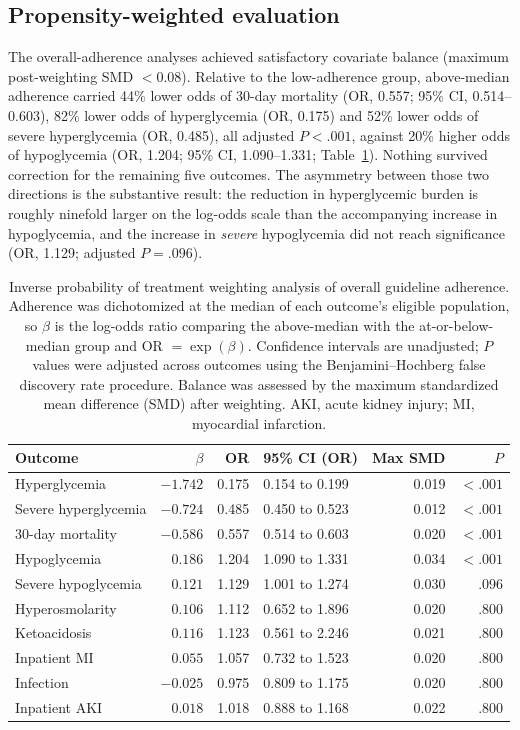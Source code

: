 \subsection{Propensity-weighted evaluation}

The overall-adherence analyses achieved satisfactory covariate balance (maximum
post-weighting SMD $<$0.08). Relative to the low-adherence group, above-median
adherence carried 44\% lower odds of 30-day mortality (OR, 0.557; 95\% CI,
0.514--0.603), 82\% lower odds of hyperglycemia (OR, 0.175) and 52\% lower odds
of severe hyperglycemia (OR, 0.485), all adjusted $P<.001$, against 20\% higher
odds of hypoglycemia (OR, 1.204; 95\% CI, 1.090--1.331;
Table~\ref{tab:iptw-overall}). Nothing survived correction for the remaining
five outcomes. The asymmetry between those two directions is the substantive
result: the reduction in hyperglycemic burden is roughly ninefold larger on the
log-odds scale than the accompanying increase in hypoglycemia, and the increase
in \emph{severe} hypoglycemia did not reach significance (OR, 1.129; adjusted
$P=.096$).

\begin{table}[t]
\centering
\caption{Inverse probability of treatment weighting analysis of overall
guideline adherence. Adherence was dichotomized at the median of each
outcome's eligible population, so $\beta$ is the log-odds ratio comparing the
above-median with the at-or-below-median group and OR $=\exp(\beta)$.
Confidence intervals are unadjusted; $P$ values were adjusted across outcomes
using the Benjamini--Hochberg false discovery rate procedure. Balance was
assessed by the maximum standardized mean difference (SMD) after weighting.
AKI, acute kidney injury; MI, myocardial infarction.}
\label{tab:iptw-overall}
\small
\setlength{\tabcolsep}{4pt}
\begin{tabular}{lrrlrr}
\toprule
Outcome & $\beta$ & OR & 95\% CI (OR) & Max SMD & $P$ \\
\midrule
Hyperglycemia        & $-1.742$ & 0.175 & 0.154 to 0.199 & 0.019 & $<.001$ \\
Severe hyperglycemia & $-0.724$ & 0.485 & 0.450 to 0.523 & 0.012 & $<.001$ \\
30-day mortality     & $-0.586$ & 0.557 & 0.514 to 0.603 & 0.020 & $<.001$ \\
Hypoglycemia         & $0.186$  & 1.204 & 1.090 to 1.331 & 0.034 & $<.001$ \\
Severe hypoglycemia  & $0.121$  & 1.129 & 1.001 to 1.274 & 0.030 & .096 \\
Hyperosmolarity      & $0.106$  & 1.112 & 0.652 to 1.896 & 0.020 & .800 \\
Ketoacidosis         & $0.116$  & 1.123 & 0.561 to 2.246 & 0.021 & .800 \\
Inpatient MI         & $0.055$  & 1.057 & 0.732 to 1.523 & 0.020 & .800 \\
Infection            & $-0.025$ & 0.975 & 0.809 to 1.175 & 0.020 & .800 \\
Inpatient AKI        & $0.018$  & 1.018 & 0.888 to 1.168 & 0.022 & .800 \\
\bottomrule
\end{tabular}
\end{table}

